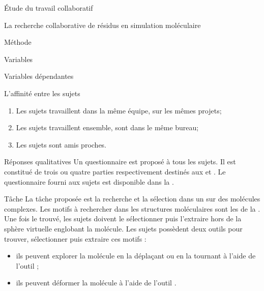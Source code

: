 \documentclass[myfrancais]{mythesis}
\begin{document}
\begin{mypart}{Étude du travail collaboratif}
\begin{mychapter}{La recherche collaborative de résidus en simulation moléculaire}
\begin{mysection}{Méthode}
\begin{mysubsection}{Variables}
\begin{mysubsubsection}{Variables dépendantes}
\begin{myparagraph}{ L'affinité entre les sujets}
\begin{enumerate}
								\item Les sujets travaillent dans la même équipe, sur les mêmes projets;
								\item Les sujets travaillent ensemble, sont dans le même bureau;
								\item Les sujets sont amis proches.
							\end{enumerate}
						\end{myparagraph}
						\begin{myparagraph}{ Réponses qualitatives}
							Un questionnaire est proposé à tous les sujets.
							Il est constitué de trois ou quatre parties respectivement destinés aux  et .
							Le questionnaire fourni aux sujets est disponible dans la .
						\end{myparagraph}
					\end{mysubsubsection}
				\end{mysubsection}
				\begin{mysubsection}[sse-exp1-Tache]{Tâche}
					La tâche proposée est la recherche et la sélection dans un  sur des molécules complexes.
					Les motifs à rechercher dans les structures moléculaires sont les  de la .
					Une fois le  trouvé, les sujets doivent le sélectionner puis l'extraire hors de la sphère virtuelle englobant la molécule.
					Les sujets possèdent deux outils pour trouver, sélectionner puis extraire ces motifs :
					\begin{itemize}
						\item ils peuvent explorer la molécule en la déplaçant ou en la tournant à l'aide de l'outil ;
						\item ils peuvent déformer la molécule à l'aide de l'outil .
					\end{itemize}


\end{mysubsection}
\end{mysection}
\end{mychapter}
\end{mypart}
\end{document}
